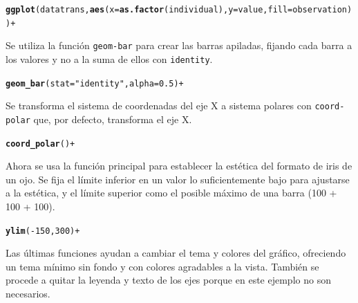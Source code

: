\documentclass{article}\usepackage[]{graphicx}\usepackage[]{color}
\makeatletter
\newcommand{\hlstr}[1]{\textcolor[rgb]{0.192,0.494,0.8}{#1}}%
\newcommand{\hlkwd}[1]{\textcolor[rgb]{0.737,0.353,0.396}{\textbf{#1}}}%
\newenvironment{kframe}{%
 \def\at@end@of@kframe{}%
 \ifinner\ifhmode%
  \def\at@end@of@kframe{\end{minipage}}%
  \begin{minipage}{\columnwidth}%
 \fi\fi%
 \def\FrameCommand##1{\hskip\@totalleftmargin \hskip-\fboxsep
 \colorbox{shadecolor}{##1}\hskip-\fboxsep
     \hskip-\linewidth \hskip-\@totalleftmargin \hskip\columnwidth}%
 \MakeFramed {\advance\hsize-\width
   \@totalleftmargin\z@ \linewidth\hsize
   \@setminipage}}%
 {\par\unskip\endMakeFramed%
 \at@end@of@kframe}
\newenvironment{knitrout}{}{} %
\makeatother
\begin{document}
\begin{knitrout}
\color{fgcolor}\begin{kframe}
\begin{alltt}
\hlkwd{ggplot}(datatrans, \hlkwd{aes}(x=\hlkwd{as.factor}(individual), y=value, fill=observation)) +      
\end{alltt}
\end{kframe}
\end{knitrout}
Se utiliza la funci\'on \texttt{geom-bar} para crear las barras apiladas, fijando cada barra a los valores y no a la suma de ellos con \texttt{identity}.
\begin{knitrout}
\color{fgcolor}\begin{kframe}
\begin{alltt}
  \hlkwd{geom_bar}(stat=\hlstr{"identity"}, alpha=0.5) +
\end{alltt}
\end{kframe}
\end{knitrout}
Se transforma el sistema de coordenadas del eje X a sistema polares con \texttt{coord-polar} que, por defecto, transforma el eje X.
\begin{knitrout}
\color{fgcolor}\begin{kframe}
\begin{alltt}
  \hlkwd{coord_polar}() +
\end{alltt}
\end{kframe}
\end{knitrout}
\clearpage
Ahora se usa la funci\'on principal para establecer la est\'etica del formato de iris de un ojo. Se fija el l\'imite inferior en un valor lo suficientemente bajo para ajustarse a la est\'etica, y el l\'imite superior como el posible m\'aximo de una barra (100 + 100 + 100).
\begin{knitrout}
\color{fgcolor}\begin{kframe}
\begin{alltt}
  \hlkwd{ylim}(-150,300) +
\end{alltt}
\end{kframe}
\end{knitrout}
Las \'ultimas funciones ayudan a cambiar el tema y colores del gr\'afico, ofreciendo un tema m\'inimo sin fondo y con colores agradables a la vista. Tambi\'en se procede a quitar la leyenda y texto de los ejes porque en este ejemplo no son necesarios.
\end{document}
